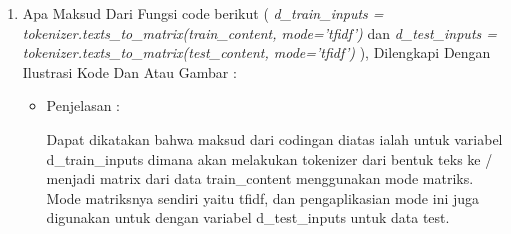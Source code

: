 \begin{enumerate}
\begin{itemize}
\item Penjelasan	:
\par  Fungsi dari Tokenizer diatas ialah untuk melakukan vektorisasi kata tentunya. Fungsi tokenizer ini mengeksekusi jumlah data yang akan diubah sebesar 2000 kata. 
\par Kemudian untuk  \emph{tokenizer.fit\_on\_texts(train\_content)} digunakan untuk melakukan fit tokenizer. Fungsi tersebut hanya direalisasikan pada data train dan tidak untuk data test kemudian hanya dalam / untuk kolom content seperti yang diperlihatkan pada codingannya.
\item Ilustrasi Kalimat ( Contoh ):
\par Jika dicontohkan dengan sebuah penjelasan maka bisa dikatakan apabila ada kata seperti " My Name Is Far " , " My Name Is ", " Your Name Is ", jika dibuatkan atau dijalankan dengan perintah yang dikatan sama maka akan nampak hasilnya seperti { 'far': 4, 'is' : 1, 'my' : 3, 'name' : 2, 'your':5 } .
\par
\par
\par
\item Ilustrasi Gambar ( Contoh Lainnya ): \ref{chapter-7-tokenizer-sum-words-fadila}
\par
\par
\begin{figure}[!hbtp]
\centering
\texttt{[image: figures/chapter-7-tokenizer-sum-words-fadila.jpg]}
\caption{Tokenizer Fit On Text- fadila}
\label{chapter-7-tokenizer-sum-words-fadila}
\end{figure}
\par
\par
\end{itemize}
\par
\par
\par
\item Apa Maksud Dari Fungsi code berikut ( \emph{d\_train\_inputs = tokenizer.texts\_to\_matrix(train\_content, mode='tfidf')} dan \emph{d\_test\_inputs = tokenizer.texts\_to\_matrix(test\_content, mode='tfidf')} ), Dilengkapi Dengan Ilustrasi Kode Dan Atau Gambar :
\begin{itemize}
\item Penjelasan	:
\par Dapat dikatakan bahwa maksud dari codingan diatas ialah untuk variabel d\_train\_inputs dimana akan melakukan tokenizer dari bentuk teks ke / menjadi matrix dari data train\_content menggunakan mode matriks. Mode matriksnya sendiri yaitu tfidf, dan pengaplikasian mode ini juga digunakan untuk dengan variabel d\_test\_inputs untuk data test.

\end{itemize}
\end{enumerate}
